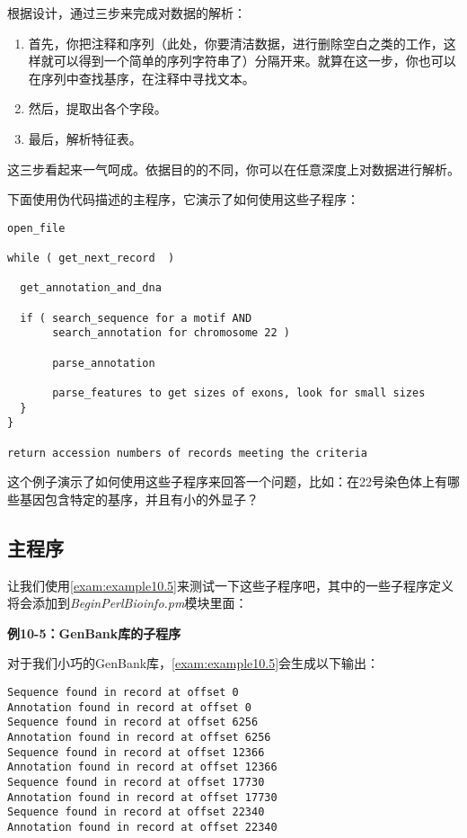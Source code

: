 根据设计，通过三步来完成对数据的解析：

\begin{enumerate}
  \item 首先，你把注释和序列（此处，你要清洁数据，进行删除空白之类的工作，这样就可以得到一个简单的序列字符串了）分隔开来。就算在这一步，你也可以在序列中查找基序，在注释中寻找文本。
  \item 然后，提取出各个字段。
  \item 最后，解析特征表。
\end{enumerate}

这三步看起来一气呵成。依据目的的不同，你可以在任意深度上对数据进行解析。

下面使用伪代码描述的主程序，它演示了如何使用这些子程序：

\begin{lstlisting}
open_file 

while ( get_next_record  )

  get_annotation_and_dna

  if ( search_sequence for a motif AND 
       search_annotation for chromosome 22 )

       parse_annotation

       parse_features to get sizes of exons, look for small sizes
  }
}

return accession numbers of records meeting the criteria
\end{lstlisting}

这个例子演示了如何使用这些子程序来回答一个问题，比如：在22号染色体上有哪些基因包含特定的基序，并且有小的外显子？
  
\subsection{主程序}
让我们使用\autoref{exam:example10.5}来测试一下这些子程序吧，其中的一些子程序定义将会添加到\textit{BeginPerlBioinfo.pm}模块里面：
  
\textbf{例10-5：GenBank库的子程序}


对于我们小巧的GenBank库，\autoref{exam:example10.5}会生成以下输出：

\begin{lstlisting}
Sequence found in record at offset 0
Annotation found in record at offset 0
Sequence found in record at offset 6256
Annotation found in record at offset 6256
Sequence found in record at offset 12366
Annotation found in record at offset 12366
Sequence found in record at offset 17730
Annotation found in record at offset 17730
Sequence found in record at offset 22340
Annotation found in record at offset 22340
\end{lstlisting}

